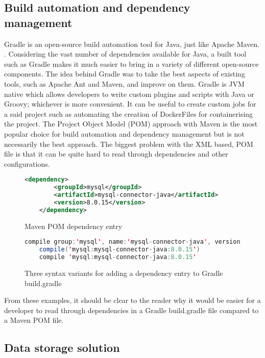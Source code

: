 \subsection{Build automation and dependency management}
Gradle is an open-source build automation tool for Java, just like Apache Maven. \cite{muschko2014gradle}.
Considering the vast number of dependencies available for Java, a built tool such as Gradle makes it much easier to bring in
a variety of different open-source components.
The idea behind Gradle was to take the best aspects of existing tools, such as Apache Ant and Maven, and improve on them.
Gradle is JVM native which allows developers to write custom plugins and scripts with Java or Groovy; whichever is more convenient.
It can be useful to create custom jobs for a said project such as automating the creation of DockerFiles for containerising
the project.
The Project Object Model (POM) approach with Maven is the most popular choice for build automation and dependency management but is not
necessarily the best approach. 
The biggest problem with the XML based, POM file is that it can be quite hard to read through dependencies and other
configurations. 

\begin{figure}[htb]
    \begin{lstlisting}[language=XML, numbers=none]
    <dependency>
        <groupId>mysql</groupId>
        <artifactId>mysql-connector-java</artifactId>
        <version>8.0.15</version>
    </dependency>
    \end{lstlisting}
    \caption{Maven POM dependency entry}
\end{figure}

\begin{figure}[htb]
    \begin{lstlisting}[language=Java, numbers=none]
    compile group:'mysql', name:'mysql-connector-java', version:'8.0.15'
    compile('mysql:mysql-connector-java:8.0.15')
    compile 'mysql:mysql-connector-java:8.0.15'
    \end{lstlisting}
    \caption{Three syntax variants for adding a dependency entry to Gradle build.gradle}
\end{figure}

From these examples, it should be clear to the reader why it would be easier for a developer to read through dependencies in a Gradle build.gradle file compared to a Maven POM file. 


\subsection{Data storage solution}

